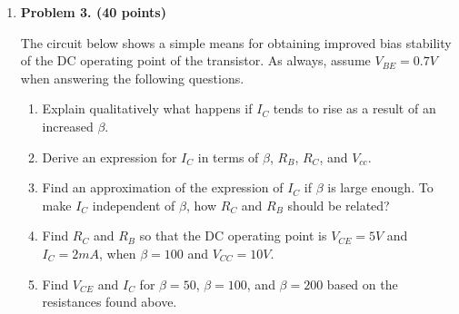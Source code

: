 \begin{enumerate}
%
%
%

\item {\bf Problem 3. (40 points)} 

The circuit below shows a simple means for obtaining improved bias
stability of the DC operating point of the transistor. As always,
assume $V_{BE}=0.7V$ when answering the following questions.


\begin{enumerate}
\item Explain qualitatively what happens if $I_C$ tends to rise as a
result of an increased $\beta$.
\item Derive an expression for $I_C$ in terms of $\beta$, $R_B$, $R_C$,
and $V_{cc}$.
\item Find an approximation of the expression of $I_C$ if $\beta$ is 
large enough. To make $I_C$ independent of $\beta$, how $R_C$ and
$R_B$ should be related?
\item Find $R_C$ and $R_B$ so that the DC operating point is $V_{CE}=5V$ 
and $I_C=2mA$, when $\beta=100$ and $V_{CC}=10V$.
\item Find $V_{CE}$ and $I_C$ for $\beta=50$, $\beta=100$, and $\beta=200$
	based on the resistances found above.
\end{enumerate}



\end{enumerate}



